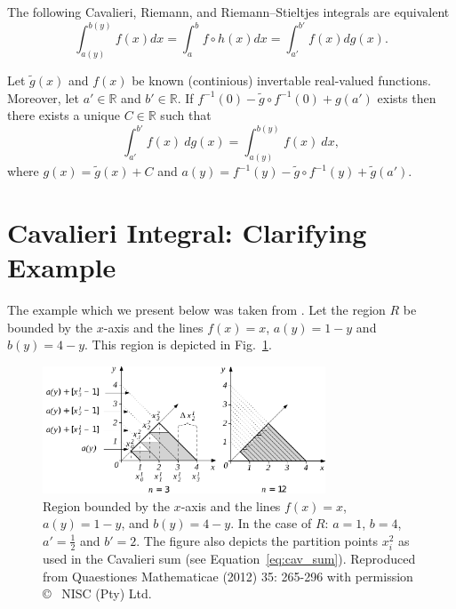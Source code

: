 \documentclass[twoside,reqno,11pt]{fcaa-var} %
\begin{document}
\begin{theorem}
\label{t:conv}
The following Cavalieri, Riemann, and Riemann--Stieltjes integrals are equivalent
\begin{equation}
\int_{a(y)}^{b(y)} f(x) dx = \int_a^b f\circ h(x) dx = \int_{a'}^{b'} f(x)dg(x). 
\end{equation}
\end{theorem}
\begin{theorem}
Let $\widetilde{g}(x)$ and $f(x)$ be known (continious) invertable real-valued functions. Moreover, let $a'\in \mathbb{R}$ and $b'\in \mathbb{R}$.  If $f^{-1}(0) - \widetilde{g}\circ f^{-1}(0) + g(a')$ exists then there exists a unique 
$C\in\mathbb{R}$ such that 
\begin{equation}
\int_{a'}^{b'} f(x)~dg(x) = \int_{a(y)}^{b(y)} f(x)~dx, 
\end{equation}
where $g(x) = \widetilde{g}(x) + C$ and $a(y) = f^{-1}(y)-\widetilde{g}\circ f^{-1}(y) + \widetilde{g}(a')$.
\end{theorem}


\section{Cavalieri Integral: Clarifying Example}
\label{sec:cav_integral_example}
The example which we present below was taken from \cite{?}. Let the region $R$ be bounded by the $x$-axis and the lines $f(x)=x$, $a(y)=1-y$ and $b(y)=4-y$. This region is depicted in Fig.~\ref{fig:caval2}.\\
\begin{figure}[htb]
\centering
\includegraphics[width=0.75\textwidth]{fig13.pdf}
\caption{Region bounded by the $x$-axis and the lines $f(x)=x$, $a(y)=1-y$, and $b(y)=4-y$. In the case of $R$: $a=1$, $b=4$, $a'=\frac{1}{2}$ and $b'=2$. The figure also depicts the partition points $x_i^2$ as used in the Cavalieri sum (see Equation~\eqref{eq:cav_sum}). Reproduced from Quaestiones Mathematicae (2012) 35: 265-296 with permission \copyright~ NISC (Pty) Ltd.}
\label{fig:caval2}
\end{figure}
\end{document}
